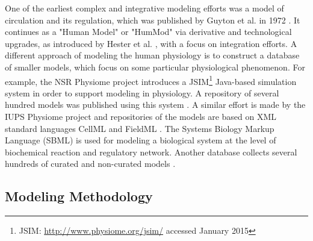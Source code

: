 One of the earliest complex and integrative modeling efforts was a model of circulation and its regulation, which was published by Guyton et al. in 1972 \cite{Guyton1972}. It continues as a "Human Model" or "HumMod" via derivative and technological upgrades, as introduced by Hester et al. \cite{Hester2011systems,hester2011}, with a focus on integration efforts. A different approach of modeling the human physiology is to construct a database of smaller models, which focus on some particular physiological phenomenon. For example, the NSR Physiome project introduces a  JSIM\footnote{JSIM: \url{http://www.physiome.org/jsim/} accessed January 2015} Java-based simulation system in order to support modeling in  physiology. A repository of several hundred models was published using this system \cite{Butterworth2014}. A similar effort is made by the IUPS Physiome project and repositories of the models are  based on XML standard languages CellML and FieldML \cite{Hunter2004,Yu2011}. The Systems Biology Markup Language (SBML) is used for modeling a biological system at the level of biochemical reaction and regulatory network. Another database collects several hundreds of curated and non-curated models \cite{Hucka2004,LeNovere2006}.




\subsection{Modeling Methodology}
\label{sec:methodsmodels}


